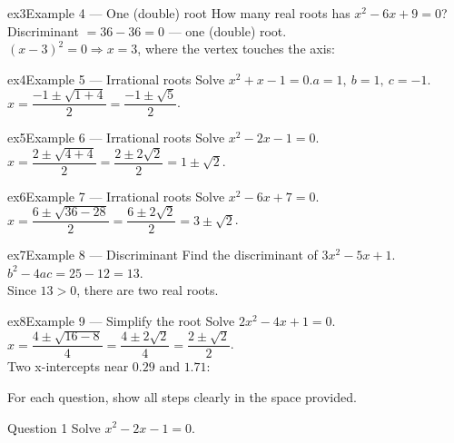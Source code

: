 \documentclass[11pt]{article}
\begin{document}
\begin{example}{ex3}{Example 4 --- One (double) root}
How many real roots has $x^2-6x+9=0$?\soln Discriminant $=36-36=0$ — one (double) root. \\ $(x-3)^2=0\Rightarrow x=3$, where the vertex touches the axis:
\end{example}

\begin{example}{ex4}{Example 5 --- Irrational roots}
Solve $x^2+x-1=0$.\soln $a=1,\ b=1,\ c=-1$. \\ $x=\dfrac{-1\pm\sqrt{1+4}}{2}=\dfrac{-1\pm\sqrt5}{2}$.
\end{example}

\begin{example}{ex5}{Example 6 --- Irrational roots}
Solve $x^2-2x-1=0$.\soln $x=\dfrac{2\pm\sqrt{4+4}}{2}=\dfrac{2\pm2\sqrt2}{2}=1\pm\sqrt2$.
\end{example}

\begin{example}{ex6}{Example 7 --- Irrational roots}
Solve $x^2-6x+7=0$.\soln $x=\dfrac{6\pm\sqrt{36-28}}{2}=\dfrac{6\pm2\sqrt2}{2}=3\pm\sqrt2$.
\end{example}

\begin{example}{ex7}{Example 8 --- Discriminant}
Find the discriminant of $3x^2-5x+1$.\soln $b^2-4ac=25-12=13$. \\ Since $13>0$, there are two real roots.
\end{example}

\begin{example}{ex8}{Example 9 --- Simplify the root}
Solve $2x^2-4x+1=0$.\soln $x=\dfrac{4\pm\sqrt{16-8}}{4}=\dfrac{4\pm2\sqrt2}{4}=\dfrac{2\pm\sqrt2}{2}$. \\ Two x-intercepts near $0.29$ and $1.71$:
\end{example}

\clearpage
{}
For each question, show all steps clearly in the space provided.

\begin{qbox}{Question 1}
Solve $x^2-2x-1=0$.\workspace{2.4cm}
\end{qbox}
\end{document}
